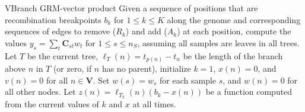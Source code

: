 \begin{taocpalg}{V}{Branch GRM-vector product}
{
    Given a sequence of positions that are recombination breakpoints $b_k$ for $1 \le k \le K$ 
    along the genome and corresponding sequences of edges to 
    remove ($R_k$) and add ($A_k$) at each position, 
    compute the values 
    $y_s=\sum_t\mathbf{C}_{st} w_t$ for $1 \le s \le n_S$, assuming all samples are leaves in all trees.
    Let $T$ be the current tree,
    $\ell_T(n) = t_{p(n)} - t_n$ be the length of the branch above $n$ in $T$ (or zero, if $n$ has no parent),
    initialize $k = 1$, $x(n) = 0$, and $v(n) = 0$ for all $n \in \mathbf{V}$.
    Set $w(s) = w_s$ for each sample $s$, and $w(n)=0$ for all other nodes.
    Let $z(n) = \ell_{T_k}(n) (b_k - x(n))$ be a function 
    computed from the current values of $k$ and $x$ at all times.
}




\end{taocpalg}


